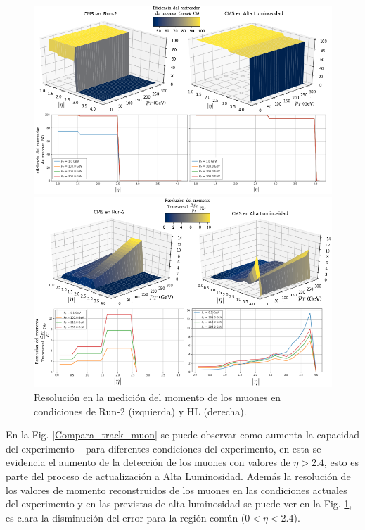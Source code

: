 \begin{figure}[!t]
\centering
\includegraphics[width=.90\textwidth]{Cap2/imagenes/Tracking_of_Muon.png}
\caption{Eficiencia de reconstrucción %
de los muones en condiciones de Run-2 (izquierda) y HL (derecha).}
\label{Compara_track_muon}
\includegraphics[width=.90\textwidth]{Cap2/imagenes/Momentum_resolution_of_Muon.png}
\caption{Resolución en la medición del momento de los muones %
en condiciones de Run-2 (izquierda) y HL (derecha).}
\label{Compara_sol_muon}
\end{figure}
En la Fig. \ref{Compara_track_muon} se puede observar como aumenta la capacidad del experimento \CMS ~ para diferentes condiciones del experimento, en esta se evidencia el aumento de la detección de los muones con valores de $\eta > 2.4$, esto es parte del proceso de actualización a Alta Luminosidad. Además la resolución de los valores de momento reconstruidos de los muones en las condiciones actuales del experimento y en las previstas de alta luminosidad se puede ver en la Fig. \ref{Compara_sol_muon}, es clara la disminución del error para la región común ($0<\eta < 2.4$).

